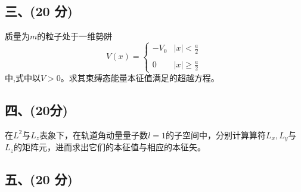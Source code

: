 \subsection{三、(20 分) }
质量为$m$的粒子处于一维勢阱
$$V(x) = 
\begin{cases} 
-V_0 & |x| < \frac{a}{2} \\\\
0 &  |x| \geq \frac{a}{2} 
\end{cases}~
$$
中,式中以$V>0$。求其束缚态能量本征值满足的超越方程。
\subsection{四、(20分) }
在$L^2$与$L_z$表象下，在轨道角动量量子数$l=1$的子空间中，分别计算算符$L_x,L_y$与$L_z$的矩阵元，进而求出它们的本征值与相应的本征矢。
\subsection{五、(20 分)}